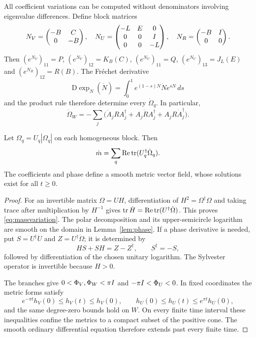 All coefficient variations can be computed without denominators involving
eigenvalue differences. Define block matrices
\[
 N_V=\begin{pmatrix}-B&C\\0&-B\end{pmatrix},\quad
 N_U=\begin{pmatrix}-L&E&0\\0&0&I\\0&0&-L\end{pmatrix},\quad
 N_R=\begin{pmatrix}-B&I\\0&0\end{pmatrix}.
\]
Then $(e^{N_V})_{11}=P$, $(e^{N_V})_{12}=K_B(C)$,
$(e^{N_U})_{11}=Q$, $(e^{N_U})_{13}=J_L(E)$ and
$(e^{N_R})_{12}=R(B)$. The Fr\'echet derivative
\begin{equation}\label{eq:duhamel}
 \mathrm D\exp_N(\dot N)=\int_0^1e^{(1-s)N}\dot N e^{sN}\,ds
\end{equation}
and the product rule therefore determine every $\dot\Omega_q$.
In particular,
\[
 \dot\Omega_W=-\sum_j\bigl(\dot A_jRA_j^\dagger+
 A_j\dot R A_j^\dagger+A_jR\dot A_j^\dagger\bigr).
\]

\begin{lemma}\label{lem:massvariation}
Let $\Omega_q=U_q|\Omega_q|$ on each homogeneous block. Then
\begin{equation}\label{eq:massvariation}
 \dot m=\sum_q\operatorname{Re}\operatorname{tr}(U_q^\dagger\dot\Omega_q).
\end{equation}
The coefficients and phase define a smooth metric vector field, whose
solutions exist for all $t\geq0$.
\end{lemma}

\begin{proof}
For an invertible matrix $\Omega=UH$, differentiation of
$H^2=\Omega^\dagger\Omega$ and taking trace after multiplication by
$H^{-1}$ gives
$\operatorname{tr}\dot H=\operatorname{Re}\operatorname{tr}(U^\dagger\dot\Omega)$.
This proves \eqref{eq:massvariation}.
The polar decomposition and its upper-semicircle logarithm are smooth
on the domain in Lemma~\ref{lem:phase}.
If a phase derivative is needed, put
$S=U^\dagger\dot U$ and $Z=U^\dagger\dot\Omega$; it is determined by
\[
 HS+SH=Z-Z^\dagger,\qquad S^\dagger=-S,
\]
followed by differentiation of the chosen unitary logarithm.
The Sylvester operator is invertible because $H>0$.

The branches give $0<\Phi_V,\Phi_W<\pi I$ and
$-\pi I<\Phi_U<0$. In fixed coordinates the metric forms satisfy
\[
 e^{-\pi t}h_V(0)\leq h_V(t)\leq h_V(0),\qquad
 h_U(0)\leq h_U(t)\leq e^{\pi t}h_U(0),
\]
and the same degree-zero bounds hold on $W$.
On every finite time interval these inequalities confine the metrics
to a compact subset of the positive cone. The smooth ordinary
differential equation therefore extends past every finite time.
\end{proof}
